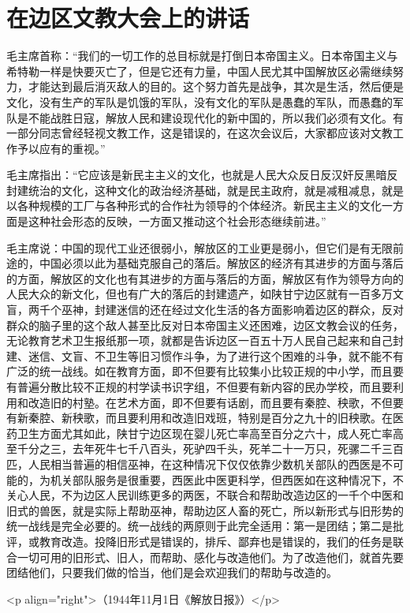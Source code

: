 \section[在边区文教大会上的讲话（一九四四年十一月一日）]{在边区文教大会上的讲话}


毛主席首称：“我们的一切工作的总目标就是打倒日本帝国主义。日本帝国主义与希特勒一样是快要灭亡了，但是它还有力量，中国人民尤其中国解放区必需继续努力，才能达到最后消灭敌人的目的。这个努力首先是战争，其次是生活，然后便是文化，没有生产的军队是饥饿的军队，没有文化的军队是愚蠢的军队，而愚蠢的军队是不能战胜日寇，解放人民和建设现代化的新中国的，所以我们必须有文化。有一部分同志曾经轻视文教工作，这是错误的，在这次会议后，大家都应该对文教工作予以应有的重视。”

毛主席指出：“它应该是新民主主义的文化，也就是人民大众反日反汉奸反黑暗反封建统治的文化，这种文化的政治经济基础，就是民主政府，就是减租减息，就是以各种规模的工厂与各种形式的合作社为领导的个体经济。新民主主义的文化一方面是这种社会形态的反映，一方面又推动这个社会形态继续前进。”

毛主席说：中国的现代工业还很弱小，解放区的工业更是弱小，但它们是有无限前途的，中国必须以此为基础克服自己的落后。解放区的经济有其进步的方面与落后的方面，解放区的文化也有其进步的方面与落后的方面，解放区有作为领导方向的人民大众的新文化，但也有广大的落后的封建遗产，如陕甘宁边区就有一百多万文盲，两千个巫神，封建迷信的还在经过文化生活的各方面影响着边区的群众，反对群众的脑子里的这个敌人甚至比反对日本帝国主义还困难，边区文教会议的任务，无论教育艺术卫生报纸那一项，就都是告诉边区一百五十万人民自己起来和自己封建、迷信、文盲、不卫生等旧习惯作斗争，为了进行这个困难的斗争，就不能不有广泛的统一战线。如在教育方面，即不但要有比较集小比较正规的中小学，而且要有普遍分散比较不正规的村学读书识字组，不但要有新内容的民办学校，而且要利用和改造旧的村塾。在艺术方面，即不但要有话剧，而且要有秦腔、秧歌，不但要有新秦腔、新秧歌，而且要利用和改造旧戏班，特别是百分之九十的旧秧歌。在医药卫生方面尤其如此，陕甘宁边区现在婴儿死亡率高至百分之六十，成人死亡率高至千分之三，去年死牛七千八百头，死驴四千头，死羊二十一万只，死骡二千三百匹，人民相当普遍的相信巫神，在这种情况下仅仅依靠少数机关部队的西医是不可能的，为机关部队服务是很重要，西医此中医更科学，但西医如在这种情况下，不关心人民，不为边区人民训练更多的两医，不联合和帮助改造边区的一千个中医和旧式的兽医，就是实际上帮助巫神，帮助边区人畜的死亡，所以新形式与旧形势的统一战线是完全必要的。统一战线的两原则于此完全适用：第一是团结；第二是批评，或教育改造。投降旧形式是错误的，排斥、鄙弃也是错误的，我们的任务是联合一切可用的旧形式、旧人，而帮助、感化与改造他们。为了改造他们，就首先要团结他们，只要我们做的恰当，他们是会欢迎我们的帮助与改造的。

<p align="right">（1944年11月1日《解放日报》）</p>

